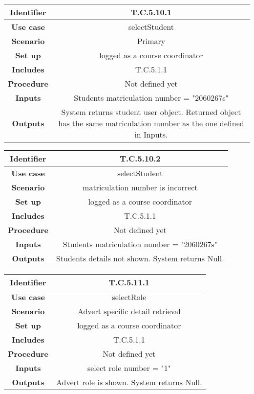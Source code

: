 \begin{tabular}{|c|c|}
\hline \textbf{Identifier} & T.C.5.10.1\\
\hline \textbf{Use case} & selectStudent\\
\hline \textbf{Scenario} & Primary\\
\hline \textbf{Set up} & logged as a course coordinator\\
\hline \textbf{Includes} & T.C.5.1.1\\
\hline \textbf{Procedure} & Not defined yet\\
\hline \textbf{Inputs} & Students matriculation number = "2060267s"\\
\hline \textbf{Outputs} & System returns student user object. Returned object has the same matriculation number as the one defined in Inputs.\\
\hline
\end{tabular}

\begin{tabular}{|c|c|}
\hline \textbf{Identifier} & T.C.5.10.2\\
\hline \textbf{Use case} & selectStudent\\
\hline \textbf{Scenario} & matriculation number is incorrect\\
\hline \textbf{Set up} & logged as a course coordinator\\
\hline \textbf{Includes} & T.C.5.1.1\\
\hline \textbf{Procedure} & Not defined yet\\
\hline \textbf{Inputs} & Students matriculation number = "2060267s"\\
\hline \textbf{Outputs} & Students details not shown. System returns Null.\\
\hline
\end{tabular}

\begin{tabular}{|c|c|}
\hline \textbf{Identifier} & T.C.5.11.1\\
\hline \textbf{Use case} & selectRole\\
\hline \textbf{Scenario} & Advert specific detail retrieval\\
\hline \textbf{Set up} & logged as a course coordinator\\
\hline \textbf{Includes} & T.C.5.1.1\\
\hline \textbf{Procedure} & Not defined yet\\
\hline \textbf{Inputs} & select role number = "1"\\
\hline \textbf{Outputs} & Advert role is shown. System returns Null.\\
\hline
\end{tabular}

